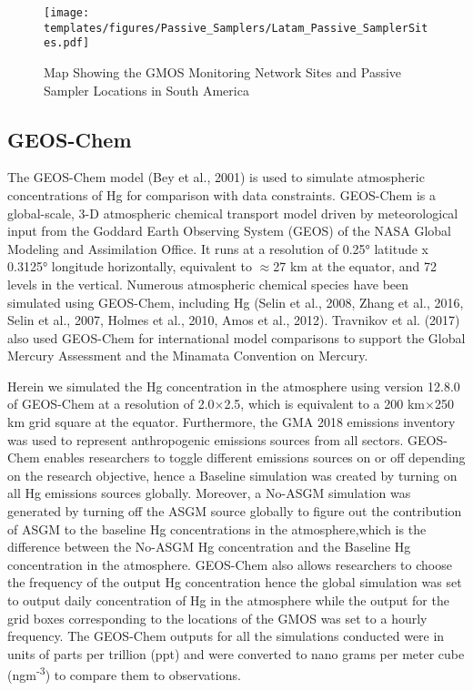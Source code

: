 \begin{figure}[H]
  \texttt{[image: templates/figures/Passive\_Samplers/Latam\_Passive\_SamplerSites.pdf]}
  \caption{Map Showing the GMOS Monitoring Network Sites and Passive Sampler Locations in South America}
  \label{fig:GMOS_PAS_stations_map}
  \centering
  
\end{figure}
\FloatBarrier



\subsection{GEOS-Chem}
\begin{flushleft}
The GEOS-Chem model (Bey et al., 2001) is used to simulate atmospheric concentrations of Hg for comparison with data constraints. GEOS-Chem is a global-scale, 3-D atmospheric chemical transport model driven by meteorological input from the Goddard Earth Observing System (GEOS) of the NASA Global Modeling and Assimilation Office. It runs at a resolution of 0.25° latitude x 0.3125° longitude horizontally, equivalent to $\approx$27 km at the equator, and 72 levels in the vertical. Numerous atmospheric chemical species have been simulated using GEOS-Chem, including Hg (Selin et al., 2008, Zhang et al., 2016, Selin et al., 2007, Holmes et al., 2010, Amos et al., 2012). Travnikov et al. (2017) also used GEOS-Chem for international model comparisons to support the Global Mercury Assessment and the Minamata Convention on Mercury.
\end{flushleft}
\begin{flushleft}

Herein we simulated the Hg concentration in the atmosphere using version 12.8.0 of GEOS-Chem at a resolution of 2.0$\times$2.5, which is equivalent to a 200 km$\times$250 km grid square at the equator. Furthermore, the GMA 2018 emissions inventory was used to represent anthropogenic emissions sources from all sectors. GEOS-Chem enables researchers to toggle different emissions sources on or off depending on the research objective, hence a Baseline simulation was created by turning on all Hg emissions sources globally. Moreover, a No-ASGM simulation was generated by turning off the ASGM source globally to figure out the contribution of ASGM to the baseline Hg concentrations in the atmosphere,which is the difference between the No-ASGM Hg concentration and the Baseline Hg concentration in the atmosphere. GEOS-Chem also allows researchers to choose the frequency of the output Hg concentration hence the global simulation was set to output daily concentration of Hg in the atmosphere while the output for the grid boxes corresponding to the locations of the GMOS was set to a hourly frequency. The GEOS-Chem outputs for all the simulations conducted were in units of parts per trillion (ppt) and were converted to nano grams per meter cube (ngm\textsuperscript{-3}) to compare them to observations.
\end{flushleft}



